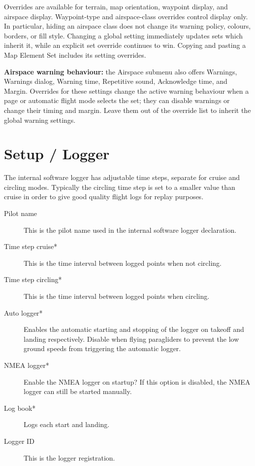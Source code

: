 Overrides are available for terrain, map orientation, waypoint display, and
airspace display.  Waypoint-type and airspace-class overrides control display
only.  In particular, hiding an airspace class does not change its warning
policy, colours, borders, or fill style.  Changing a global setting immediately
updates sets which inherit it, while an explicit set override continues to win.
Copying and pasting a Map Element Set includes its setting overrides.

\textbf{Airspace warning behaviour:} the Airspace submenu also offers
Warnings, Warnings dialog, Warning time, Repetitive sound, Acknowledge time,
and Margin.  Overrides for these settings change the active warning behaviour
when a page or automatic flight mode selects the set; they can disable
warnings or change their timing and margin.  Leave them out of the override
list to inherit the global warning settings.

\section{Setup / Logger} \label{conf:logger}

The internal software logger has adjustable time steps, separate for
cruise and circling modes.  
Typically the circling time step is set to a smaller value
than cruise in order to give good quality flight logs for replay
purposes.

\begin{description}
\item[Pilot name]  This is the pilot name used in the internal software logger 
  declaration.
\item[Time step cruise*]  This is the time interval between logged points when 
  not circling. 
\item[Time step circling*]  This is the time interval between logged points when 
  circling. 
\item[Auto logger*]  Enables the automatic starting and stopping of the logger
  on takeoff and landing respectively. Disable when flying paragliders to prevent 
  the low ground speeds from triggering the automatic logger.
\item[NMEA logger*]  Enable the NMEA logger on startup? If this option is disabled, 
  the NMEA logger can still be started manually.
\item[Log book*]  Logs each start and landing.
\item[Logger ID]  This is the logger registration.
\end{description}



